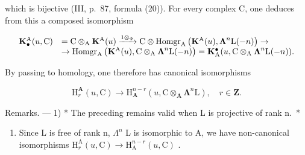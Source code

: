 which is bijective (III, p.~87, formula (20)). For every complex C, one deduces from this a composed isomorphism

\[
\begin{array}{r l} \mathbf {K} _ {\bullet} ^ {\mathrm{A}} (u, \mathrm{C}) & = \mathrm{C} \otimes_ {\mathrm{A}} \mathbf {K} ^ {\mathrm{A}} (u) \xrightarrow {1 \otimes_ {\Phi}} \mathrm{C} \otimes \operatorname{Homgr} _ {\mathrm{A}} \left(\mathbf {K} ^ {\mathrm{A}} (u), \boldsymbol {\Lambda} ^ {n} \mathrm{L} (- n)\right) \to \\ & \to \operatorname{Homgr} _ {\mathrm{A}} \left(\mathbf {K} ^ {\mathrm{A}} (u), \mathrm{C} \otimes_ {\mathrm{A}} \boldsymbol {\Lambda} ^ {n} \mathrm{L} (- n)\right) = \mathbf {K} _ {\mathrm{A}} ^ {\bullet} (u, \mathrm{C} \otimes_ {\mathrm{A}} \boldsymbol {\Lambda} ^ {n} \mathrm{L} (- n)). \end{array}
\]

By passing to homology, one therefore has canonical isomorphisms

\[
\mathrm{H} _ {r} ^ {\mathbf {A}} (u, \mathrm{C}) \rightarrow \mathrm{H} _ {\mathbf {A}} ^ {n - r} (u, \mathrm{C} \otimes_ {\mathbf {A}} \boldsymbol {\Lambda} ^ {n} \mathrm{L}), \quad r \in \mathbf {Z}.\tag{8}
\]

Remarks. --- 1) * The preceding remains valid when L is projective of rank n.~*

\begin{enumerate}
\def\labelenumi{\arabic{enumi})}
\setcounter{enumi}{1}
\tightlist
\item
  Since L is free of rank n, \(\Lambda^{n}\) L is isomorphic to A, we have non-canonical isomorphisms \(\mathrm{H}_{r}^{\mathrm{A}}(u,\mathrm{C})\to\mathrm{H}_{\mathrm{A}}^{n-r}(u,\mathrm{C})\) .
\end{enumerate}

